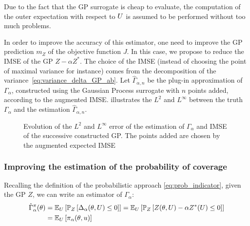 \documentclass[../../Main_ManuscritThese.tex]{subfiles}
\newcommand\imgpath{/home/victor/acadwriting/Manuscrit/Text/Chapter4/img/}
\begin{document}
  Due to the fact that the GP surrogate is cheap to evaluate, the computation of the outer expectation with respect to $U$ is assumed to be performed without too much problems.

  In order to improve the accuracy of this estimator, one need to improve the GP prediction $m_Z$ of the objective function $J$.
  In this case, we propose to reduce the IMSE of the GP $Z - \alpha Z^*$. The choice of the IMSE (instead of choosing the point of maximal variance for instance) comes from the decomposition of the variance~\cref{eq:variance_delta_GP_ab}.
  Let $\hat{\Gamma}_{\alpha,n}$ be the plug-in approximation of $\Gamma_\alpha$, constructed using the Gaussian Process surrogate with $n$ points added, according to the augmented IMSE.  illustrates the $L^2$ and $L^{\infty}$ between the truth $\Gamma_\alpha$ and the estimation $\hat{\Gamma}_{\alpha,n}$.

\begin{figure}[ht]
  \centering
  
  \caption{\label{fig:IMSE_enrichment} Evolution of the $L^2$ and $L^\infty$ error of the estimation of $\Gamma_\alpha$ and IMSE of the successive constructed GP. The points added are chosen by the augmented expected IMSE}
\end{figure}

  
\subsubsection{Improving the estimation of the probability of coverage}
\cite{echard_ak-mcs_2011,schobi_rare_2017,razaaly_quantile-based_2020}

Recalling the definition of the probabilistic approach \cref{eq:prob_indicator}, given the GP $Z$, we can write an estimator of $\Gamma_{\alpha}$:
\begin{align}
  \hat{\Gamma}_{\alpha}^{\pi}(\theta) &= \mathbb{E}_U\left[ \mathbb{P}_{Z}\left[ \Delta_{\alpha}(\theta,U) \leq 0\right]\right] = \mathbb{E}_U\left[ \mathbb{P}_{Z}\left[ Z(\theta, U) - \alpha Z^*(U) \leq 0\right]\right] \\ &= \mathbb{E}_U\left[\pi_{\alpha}(\theta,u)\right]
\end{align}
\end{document}
